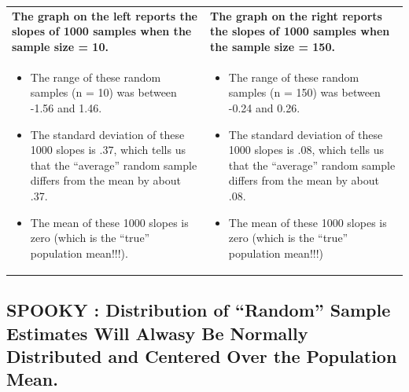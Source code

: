 \documentclass[
  letterpaper,
  DIV=11,
  numbers=noendperiod,
  oneside]{scrreprt}
\begin{document}
\begin{longtable}[]{@{}
  >{\raggedright\arraybackslash}p{}
  >{\raggedright\arraybackslash}p{}@{}}
\toprule\noalign{}
\endhead
\bottomrule\noalign{}
\endlastfoot
\textbf{The graph on the left reports the slopes of 1000 samples when
the sample size = 10.} & \textbf{The graph on the right reports the
slopes of 1000 samples when the sample size = 150.} \\
\begin{minipage}[t]{\linewidth}\raggedright
\begin{itemize}
\item
  The range of these random samples (n = 10) was between -1.56 and 1.46.
\item
  The standard deviation of these 1000 slopes is .37, which tells us
  that the ``average'' random sample differs from the mean by about .37.
\item
  The mean of these 1000 slopes is zero (which is the ``true''
  population mean!!!).
\end{itemize}
\end{minipage} & \begin{minipage}[t]{\linewidth}\raggedright
\begin{itemize}
\item
  The range of these random samples (n = 150) was between -0.24 and
  0.26.
\item
  The standard deviation of these 1000 slopes is .08, which tells us
  that the ``average'' random sample differs from the mean by about .08.
\item
  The mean of these 1000 slopes is zero (which is the ``true''
  population mean!!!)
\end{itemize}
\end{minipage} \\
\end{longtable}

\subsection{\texorpdfstring{\textbf{SPOOKY : Distribution of ``Random''
Sample Estimates Will Alwasy Be Normally Distributed and Centered Over
the Population
Mean.}}{SPOOKY : Distribution of ``Random'' Sample Estimates Will Alwasy Be Normally Distributed and Centered Over the Population Mean.}}\label{spooky-distribution-of-random-sample-estimates-will-alwasy-be-normally-distributed-and-centered-over-the-population-mean.}
\end{document}
